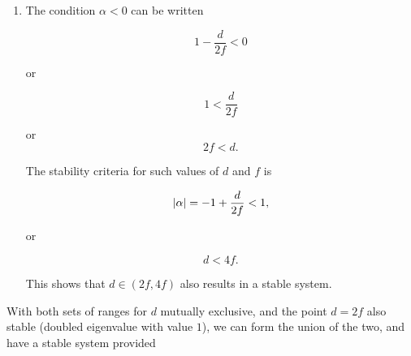{\begin{enumerate}
or

\begin{dmath}\label{eqn:problemSet4Problem2:560}
1 > \frac{d}{2f},
\end{dmath}

or
\begin{dmath}\label{eqn:problemSet4Problem2:580}
d < 2 f.
\end{dmath}

For these positive values of $\alpha$ we have

\begin{dmath}\label{eqn:problemSet4Problem2:440}
1 - \frac{d}{2f} < 1
\end{dmath}

or
\begin{dmath}\label{eqn:problemSet4Problem2:600}
\frac{d}{2f} > 0,
\end{dmath}

which just means that $d$ is positive.  This shows that $d \in (0, 2f)$ results in a stable system.

\item The condition $\alpha < 0$ can be written

\begin{dmath}\label{eqn:problemSet4Problem2:460}
1 - \frac{d}{2f} < 0
\end{dmath}

or

\begin{dmath}\label{eqn:problemSet4Problem2:480}
1 < \frac{d}{2f}
\end{dmath}

or
\begin{dmath}\label{eqn:problemSet4Problem2:500}
2f < d.
\end{dmath}

The stability criteria for such values of $d$ and $f$ is

\begin{dmath}\label{eqn:problemSet4Problem2:520}
\Abs{\alpha} = -1 + \frac{d}{2f} < 1,
\end{dmath}

or

\begin{dmath}\label{eqn:problemSet4Problem2:540}
d < 4 f.
\end{dmath}

This shows that $d \in (2 f, 4 f)$ also results in a stable system.
\end{enumerate}

With both sets of ranges for $d$ mutually exclusive, and the point $d = 2f$ also stable (doubled eigenvalue with value $1$), we can form the union of the two, and have a stable system provided

}
